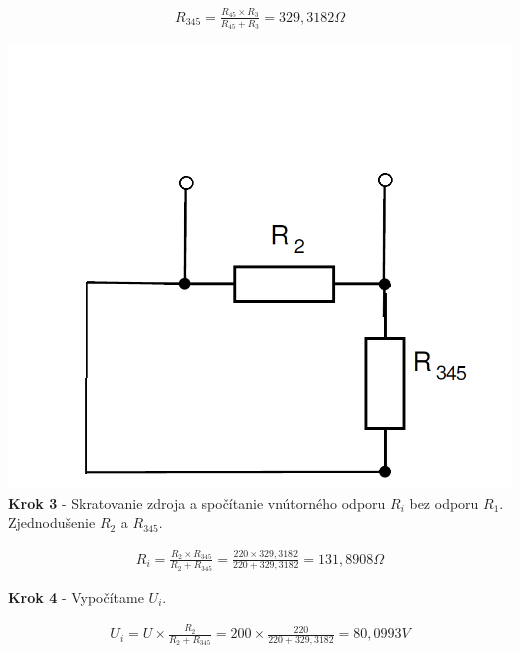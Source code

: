 \begin{gather*}
R_{345}=\frac{R_{45} \times R_{3}}{R_{45}+R_{3}}=329,3182\Omega 
\end{gather*}


\begin{center}
\includegraphics[scale=0.5,keepaspectratio]{fig/obr/Pr2_3.png} \\
\textbf{Krok 3} - Skratovanie zdroja a spočítanie vnútorného odporu $R_{i}$ bez odporu $R_{1}$. Zjednodušenie $R_{2}$ a $R_{345}$.
\end{center}

\begin{gather*}
R_{i}=\frac{R_{2} \times R_{345}}{R_{2}+R_{345}}=\frac{220 \times 329,3182}{220+329,3182}=131,8908\Omega 
\end{gather*}

\newpage

\begin{center}
\textbf{Krok 4} - Vypočítame $U_{i}$.
\end{center}

\begin{gather*}
U_{i}=U \times \frac{R_{2}}{R_{2}+R_{345}}=200 \times \frac{220}{220+329,3182}=80,0993V 
\end{gather*}

